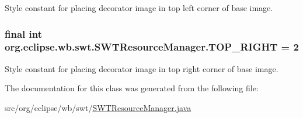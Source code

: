 Style constant for placing decorator image in top left corner of base image. \hypertarget{classorg_1_1eclipse_1_1wb_1_1swt_1_1_s_w_t_resource_manager_a024b59862eb3bc6eec12dd2bec92c1e5}{
\subsubsection[{T\-O\-P\-\_\-\-R\-I\-G\-H\-T}]{\setlength{\rightskip}{0pt plus 5cm}final int org.\-eclipse.\-wb.\-swt.\-S\-W\-T\-Resource\-Manager.\-T\-O\-P\-\_\-\-R\-I\-G\-H\-T = 2\hspace{0.3cm}{\ttfamily [static]}}}\label{classorg_1_1eclipse_1_1wb_1_1swt_1_1_s_w_t_resource_manager_a024b59862eb3bc6eec12dd2bec92c1e5}
Style constant for placing decorator image in top right corner of base image. 

The documentation for this class was generated from the following file\-:\begin{DoxyCompactItemize}
\item 
src/org/eclipse/wb/swt/\hyperlink{_s_w_t_resource_manager_8java}{S\-W\-T\-Resource\-Manager.\-java}\end{DoxyCompactItemize}
